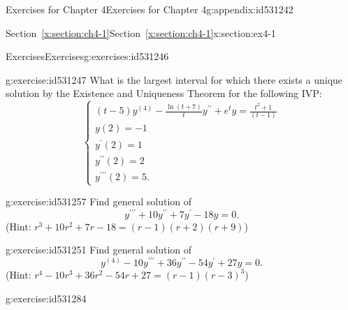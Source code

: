 \documentclass[oneside,10pt,]{book}
\newcommand{\xreffont}{\relax}
\numberwithin{equation}{section}
\numberwithin{equation}{section}
\begin{document}
\begin{appendixptx}{Exercises for Chapter 4}{}{Exercises for Chapter 4}{}{}{g:appendix:id531242}
%
%
\typeout{************************************************}
\typeout{Section E.1 Section~{\xreffont\ref*{x:section:ch4-1}}}
\typeout{************************************************}
%
\begin{sectionptx}{Section~{\xreffont\ref*{x:section:ch4-1}}}{}{Section~{\xreffont\ref*{x:section:ch4-1}}}{}{}{x:section:ex4-1}
%
%
\typeout{************************************************}
\typeout{************************************************}
%
\begin{exercises-subsection-numberless}{Exercises}{}{Exercises}{}{}{g:exercises:id531246}
\begin{divisionexercise}{1}{}{}{g:exercise:id531247}%
What is the largest interval for which there exists a unique solution by the Existence and Uniqueness Theorem for the following IVP:%
\begin{equation*}
\begin{cases}
\left(t-5\right)y^{(4)}-\frac{\ln\left(t+7\right)}{t}y^{\prime\prime}+e^{t}y=\frac{t^{2}+1}{\left(t-1\right)}\\
y(2)=-1\\
y^{\prime}(2)=1\\
y^{\prime\prime}(2)=2\\
y^{\prime\prime\prime}(2)=5.
\end{cases}
\end{equation*}
%
\end{divisionexercise}%
\begin{divisionexercise}{2}{}{}{g:exercise:id531257}%
Find general solution of%
\begin{equation*}
y^{\prime\prime\prime}+10y^{\prime\prime}+7y^{\prime}-18y=0.
\end{equation*}
(Hint: \(r^{3}+10r^{2}+7r-18=\left(r-1\right)\left(r+2\right)\left(r+9\right)\))%
\end{divisionexercise}%
\begin{divisionexercise}{3}{}{}{g:exercise:id531251}%
Find general solution of%
\begin{equation*}
y^{(4)}-10y^{\prime\prime\prime}+36y^{\prime\prime}-54y^{\prime}+27y=0.
\end{equation*}
(Hint: \(r^{4}-10r^{3}+36r^{2}-54r+27=\left(r-1\right)\left(r-3\right)^{3}\))%
\end{divisionexercise}%
\begin{divisionexercise}{4}{}{}{g:exercise:id531284}%

\end{divisionexercise}
\end{exercises-subsection-numberless}
\end{sectionptx}
\end{appendixptx}
\end{document}
